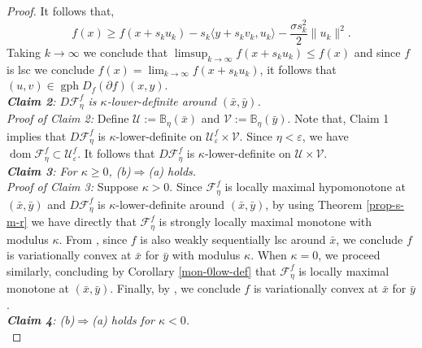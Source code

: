 \documentclass[smallextended,envcountsect,envcountsame]{svjour3}
\newcommand{\gph}{\operatorname{gph}}
\newcommand{\dom}{\operatorname{dom}}
\renewcommand{\epsilon}{\varepsilon}
\newcommand{\1}{\mathds{1}}
\begin{document}
\begin{proof}
		It follows that,
		$$ f(x)\geq f(x+s_k u_k) - s_k\langle y+s_kv_k,u_k \rangle - \frac{\sigma s_k^2}{2}\|u_k\|^2.$$
		Taking $k\to\infty$ we conclude that $\displaystyle\limsup_{k\to\infty} f(x+s_k u_k) \leq f(x)$ and since $f$ is lsc we conclude $\displaystyle f(x) = \lim_{k\to\infty} f(x+s_k u_k)$, it follows that $(u,v)\in \gph D_f(\partial f)(x,y)$.\\
		\emph{{\bf Claim 2}: $D\mathscr{F}_\eta^f$ is $\kappa$-lower-definite around $(\bar x ,\bar y)$.}\\
		\emph{Proof of Claim 2:} Define $\mathcal{U} := \mathbb{B}_\eta(\bar x)$ and $\mathcal{V} := \mathbb{B}_\eta(\bar y)$. Note that, Claim 1 implies that $D\mathscr{F}_\eta^f$ is $\kappa$-lower-definite on $\mathcal{U}_{\epsilon}^f\times \mathcal{V}$. Since $\eta<\epsilon$, we have $\dom \mathscr{F}_\eta^f\subset \mathcal{U}_{\epsilon}^f$. It follows that $D\mathscr{F}_\eta^f$ is $\kappa$-lower-definite on $\mathcal{U}\times \mathcal{V}$.\\
		\emph{{\bf Claim 3}: For $\kappa\geq 0$, (b)$\Rightarrow$(a) holds.}\\
		\emph{Proof of Claim 3:} Suppose $\kappa>0$. Since $\mathscr{F}_\eta^f$ is locally maximal hypomonotone at $(\bar x,\bar y)$ and $D\mathscr{F}_\eta^f$ is $\kappa$-lower-definite around $(\bar x,\bar y)$, by using Theorem \ref{prop-s-m-r} we have directly that $\mathscr{F}_\eta^f$ is strongly locally maximal monotone with modulus $\kappa$. From \cite[Theorem 6.10]{MR4784083}, since $f$ is also weakly sequentially lsc around $\bar x$, we conclude $f$ is variationally convex at $\bar x$ for $\bar y$ with modulus $\kappa$. When $\kappa = 0$, we proceed similarly, concluding by Corollary \ref{mon-0low-def} that $\mathscr{F}_\eta^f$ is locally maximal monotone at $(\bar x,\bar y)$. Finally, by \cite[Theorem 6.6]{MR4784083}, we conclude $f$ is variationally convex at $\bar x$ for $\bar y$.\\
		\emph{{\bf Claim 4}: (b)$\Rightarrow$(a) holds for $\kappa<0$.}\\

\end{proof}
\end{document}
